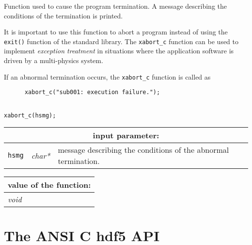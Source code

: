 Function used to cause the program termination. A message describing the conditions of the
termination is printed.

\vskip 0.2cm

It is important to use this function to abort a program instead of using the {\tt exit()}
function of the standard library. The {\tt xabort\_c} function can be used to implement {\sl exception
treatment} in situations where the application software is driven by a multi-physics system.

\vskip 0.2cm

If an abnormal termination occurs, the {\tt xabort\_c} function is called as
\begin{verbatim}
      xabort_c("sub001: execution failure.");
\end{verbatim}

\begin{verbatim}

xabort_c(hsmg);
\end{verbatim}

\noindent
\begin{tabular}{|p{1.5cm}|p{2cm}|p{11cm}|}
\hline
\multicolumn{3}{|c|}{\bf input parameter:} \\
\hline
{\tt hsmg} & {\it char*} & message describing the conditions of the abnormal termination. \\
\hline
\end{tabular}
\vskip 0.8cm

\noindent
\begin{tabular}{|p{4.0cm}|p{11cm}|}
\hline
\multicolumn{2}{|c|}{\bf value of the function:} \\
\hline
{\it void} &  \\
\hline
\end{tabular}

\clearpage

\section {The ANSI C {\sc hdf5} API}\label{sect:hdf5apiC}

